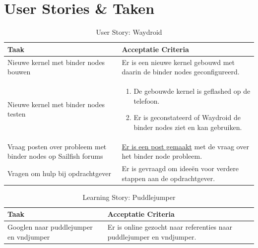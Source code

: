 \documentclass[a4paper]{report}
\newcommand{\learningstorycolor}{PaleGreen1}
\newcommand{\userstorycolor}{PeachPuff1}
\begin{document}
\section{User Stories \& Taken}
\begin{tcolorbox}[colback=white, coltitle=black, colframe=\userstorycolor, title=\textbf{User Story: }Als developer wil ik Waydroid als package kunnen bouwen\, zodat er android apps op de telefoon gerund kunnen worden.]
  \begin{table}[H]
      \centering
    \begin{tabularx}{1\textwidth}{|X|X|}
      \hline
      \cellcolor[HTML]{ffcc99} \textbf{Taak} & \cellcolor[HTML]{ffcc99} \textbf{Acceptatie Criteria} \\ 
      \hline 
      Nieuwe kernel met binder nodes bouwen & Er is een nieuwe kernel gebouwd met daarin de binder nodes geconfigureerd. \\
      \hline
      Nieuwe kernel met binder nodes testen &  
      \begin{enumerate}[leftmargin=.4cm, topsep=0cm, itemsep=.2cm]
        \item De gebouwde kernel is geflashed op de telefoon.
        \item Er is geconstateerd of Waydroid de binder nodes ziet en kan gebruiken.
      \end{enumerate}\\ 
      \hline 
      Vraag posten over probleem met binder nodes op Sailfish forums & \href{https://forum.sailfishos.org/t/the-fairphone-4-thread/17543/2?u=dimac4455}{Er is een post gemaakt} met de vraag over het binder node probleem. \\
      \hline 
      Vragen om hulp bij opdrachtgever & Er is gevraagd om ideeën voor verdere stappen aan de opdrachtgever. \\
      \hline       
    \end{tabularx}
    \caption{User Story: Waydroid}
  \label{table:it6:story_waydroid}
  \end{table}
  \end{tcolorbox}
  
\begin{tcolorbox}[colback=white, coltitle=black, colframe=\learningstorycolor, title=\textbf{Learning Story: }Als developer wil ik weten wat puddlejumper en vndjumper is\, zodat ik kan begrijpen hoe ik de binder nodes moet configureren.]
  \begin{table}[H]
      \centering
    \begin{tabularx}{1\textwidth}{|X|X|}
      \hline
      \cellcolor[HTML]{ffcc99} \textbf{Taak} & \cellcolor[HTML]{ffcc99} \textbf{Acceptatie Criteria} \\ 
      \hline 
      Googlen naar puddlejumper en vndjumper & Er is online gezocht naar referenties naar puddlejumper en vndjumper. \\
      \hline
    \end{tabularx}
    \caption{Learning Story: Puddlejumper}
  \label{table:it6:story_puddlejumper}
  \end{table}
  \end{tcolorbox}
\end{document}
